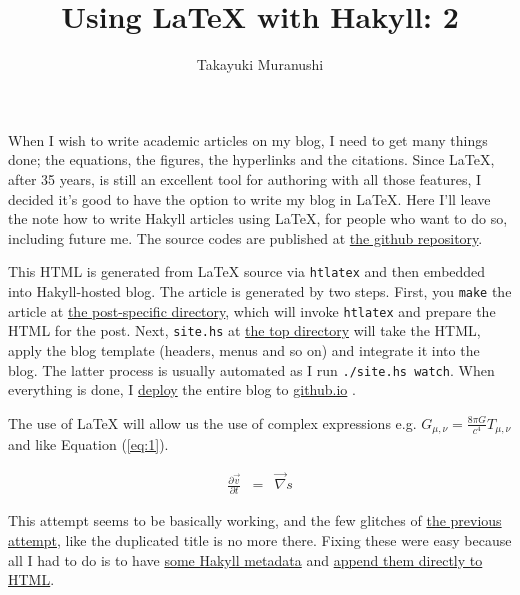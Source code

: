 \documentclass{article}
\title{Using {\LaTeX} with Hakyll: 2}
\author{Takayuki Muranushi}
\begin{document}
\maketitle

When I wish to write academic articles on my blog, I need to get many things done; the equations, the figures,
the hyperlinks and the citations. Since LaTeX, after 35 years, is still an excellent tool for authoring with all
those features, I decided it's good to have the option to write my blog in LaTeX. Here I'll leave the note how to write
Hakyll articles using LaTeX, for people who want to do so, including future me. The source codes are published at
\href{https://github.com/nushio3/nushio3.github.io}{the github repository}.


This HTML is generated from {\LaTeX} source via {\tt htlatex}
and then embedded into Hakyll-hosted blog.
The article is generated by two steps. First, you {\tt make} the article at
\href{https://github.com/nushio3/nushio3.github.io/tree/source/posts/2015-07-03-HTLaTeX}{the post-specific directory},
which will invoke  {\tt htlatex} and prepare the HTML for the post. Next,  {\tt site.hs} at
\href{https://github.com/nushio3/nushio3.github.io}{the top directory} will take the HTML, apply the blog template (headers, menus and so on) and integrate it into the blog. The latter process is usually automated as I run {\tt ./site.hs watch}.
When everything is done, I \href{https://github.com/nushio3/nushio3.github.io/blob/source/deploy.sh}{deploy} the entire blog to
\href{http://nushio3.github.io/}{github.io} .


The use of LaTeX will allow us the use of
complex expressions e.g. $G_{\mu,\nu}=\frac{8\pi G}{c^4}T_{\mu,\nu}$ and like Equation (\ref{eq:1}).

\begin{eqnarray}
\frac{\partial{\vec v}}{\partial t} &=& \vec \nabla s \label{eq:1}
\end{eqnarray}



This attempt seems to be basically working, and the few
glitches of
\href{http://nushio3.github.io/posts/2014-10-09-LaTeX2HTML/post/post.html}{the previous attempt},
like the duplicated title is no more there. Fixing these were easy because
all I had to do is to have
\href{https://github.com/nushio3/nushio3.github.io/blob/source/posts/2015-07-03-HTLaTeX/metadata.md}{some Hakyll metadata} and
\href{https://github.com/nushio3/nushio3.github.io/blob/source/posts/2015-07-03-HTLaTeX/Makefile}{append them directly to HTML}.
\end{document}
